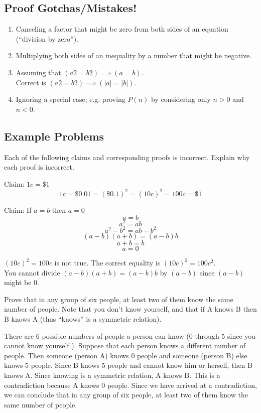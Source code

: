 \documentclass[solution, letterpaper]{cs20}
\begin{document}
	\subsection{Proof Gotchas/Mistakes!}
    	\begin{enumerate}
            \item Canceling a factor that might be zero from both sides of an equation (“division by zero”).
            \item Multiplying both sides of an inequality by a number that might be negative.
            \item Assuming that $(a2 = b2) \implies (a = b)$.
            \\ Correct is $(a2 = b2) \implies (|a| = |b|)$.
            \item Ignoring a special case; e.g. proving $P(n)$ by considering only $n > 0$ and $n < 0$.
        \end{enumerate}

	\subsection{Example Problems}

	    \problem{}{}

        Each of the following claims and corresponding proofs is incorrect. Explain why each proof is incorrect.

        \subproblem Claim: $1c = \$1$   \[ 1c = \$0.01= (\$ 0.1)^2 = (10c)^2 = 100c =\$1 \]

        \subproblem Claim: If $a=b$ then $a=0$\\ \[a=b\]\[a^2=ab\]\[a^2-b^2=ab-b^2\]\[(a-b)(a+b)=(a-b)b\]\[a+b=b\]\[a=0\]

        \begin{solution}
          \subsolution $(10c)^2 = 100c$ is not true. The correct equality is $(10c)^2 = 100c^2$.
          \\
          \subsolution You cannot divide $(a-b)(a+b) = (a-b)b$ by $(a-b)$ since $(a-b)$ might be 0.
        \end{solution}

        \problem{}{}
        Prove that in any group of six people, at least two of them know the same number of people. Note that you don’t know yourself, and that if A knows B then B knows A (thus “knows” is a symmetric relation).

        \begin{solution}
        There are 6 possible numbers of people a person can know (0 through 5 since you cannot know yourself ).
        Suppose that each person knows a different number of people. Then someone (person A) knows 0 people and someone (person B) else knows 5 people. Since B knows 5 people and cannot know him or herself, then B knows A. Since knowing is a symmetric relation, A knows B. This is a contradiction because A knows 0 people.
        Since we have arrived at a contradiction, we can conclude that in any group of six people, at least two of them know the same number of people.
        \end{solution}
\end{document}
